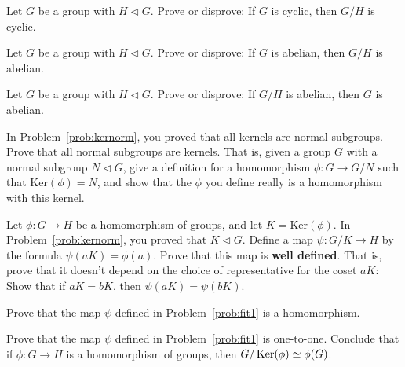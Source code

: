 \begin{problem}
Let \(G\) be a group with \(H \lhd G\). Prove or disprove: If \(G\) is cyclic, then \(G/H\) is cyclic.
\end{problem}

\begin{problem}
Let \(G\) be a group with \(H \lhd G\). Prove or disprove: If \(G\) is abelian, then \(G/H\) is abelian.
\end{problem}

\begin{problem}
Let \(G\) be a group with \(H \lhd G\). Prove or disprove: If \(G/H\) is abelian, then \(G\) is abelian.
\end{problem}

\begin{problem}\label{prob:canonproj}
 In Problem~\ref{prob:kernorm}, you proved that all kernels are normal subgroups. Prove that all normal subgroups are kernels. That is, given a group \(G\) with a normal subgroup \(N \lhd G\), give a definition for a homomorphism \(\phi: G \longrightarrow G/N \) such that \(\mbox{Ker}(\phi)=N\), and show that the $\phi$ you define really is a homomorphism with this kernel.
\begin{annotation}
\end{annotation}
\end{problem}

\begin{problem}\label{prob:fit1}
Let \(\phi: G\longrightarrow H\) be a homomorphism of groups, and let \(K = \mbox{Ker}(\phi)\). In Problem~\ref{prob:kernorm}, you proved that \(K \lhd G\). Define a map \(\psi : G/K \longrightarrow H\) by the formula \(\psi(aK)=\phi(a)\). Prove that this map is \textbf{well defined}. That is, prove that it doesn't depend on the choice of representative for the coset \(aK\): Show that if \(aK = bK\), then \(\psi(aK)=\psi(bK)\).
\end{problem}

\begin{problem}
Prove that the map \(\psi\) defined in Problem~\ref{prob:fit1} is a homomorphism.
\end{problem}

\begin{problem}\label{prob:fit2}
Prove that the map \(\psi\) defined in Problem~\ref{prob:fit1} is one-to-one.  Conclude that if \(\phi: G\longrightarrow H\) is a homomorphism of groups, then  \(G/\operatorname{Ker}(\phi) \simeq \phi(G)\).
\begin{annotation}
\end{annotation}
\end{problem}

